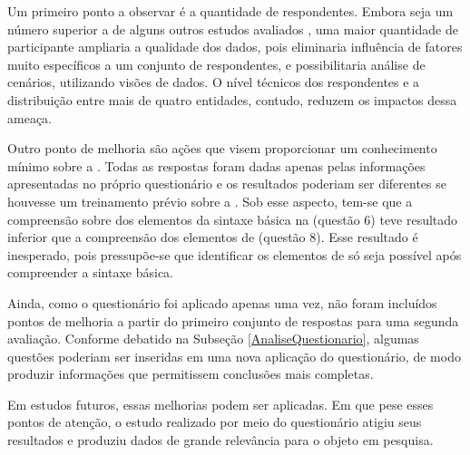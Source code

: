 Um primeiro ponto a observar é a quantidade de respondentes. Embora seja um
número superior a de alguns outros estudos avaliados
\cite{albuquerque2015quantifying}
\cite{hernandes2010avaliaccao} \cite{laitenberger1998evaluating}, uma maior
quantidade de participante ampliaria a qualidade dos dados, pois eliminaria influência de fatores muito
específicos a um conjunto de respondentes, e possibilitaria análise de 
cenários, utilizando visões de dados. O nível técnicos dos respondentes e a
distribuição entre mais de quatro entidades, contudo, reduzem os impactos dessa
ameaça.

Outro ponto de melhoria são ações que visem proporcionar um conhecimento mínimo
sobre a \neoidl{}. Todas as respostas foram dadas apenas pelas informações
apresentadas no próprio questionário e os resultados poderiam ser diferentes se
houvesse um treinamento prévio sobre a \neoidl{}. Sob esse aspecto, tem-se que a
compreensão sobre dos elementos da sintaxe básica na \neoidl{} (questão 6) teve
resultado inferior que a compreensão dos elementos de \designbycontract{}
(questão 8). Esse resultado é inesperado, pois pressupõe-se que identificar os
elementos de \designbycontract{} só seja possível após compreender a sintaxe
básica.

Ainda, como o questionário foi aplicado apenas uma vez, não foram incluídos
pontos de melhoria a partir do primeiro conjunto de respostas para uma segunda
avaliação. Conforme debatido na Subseção \ref{AnaliseQuestionario}, algumas
questões poderiam ser inseridas em uma nova aplicação do questionário, de
modo produzir informações que permitissem conclusões mais completas.

Em estudos futuros, essas melhorias podem ser aplicadas. Em que pese esses
pontos de atenção, o estudo realizado por meio do questionário atigiu seus
resultados e produziu dados de grande relevância para o objeto em pesquisa.


